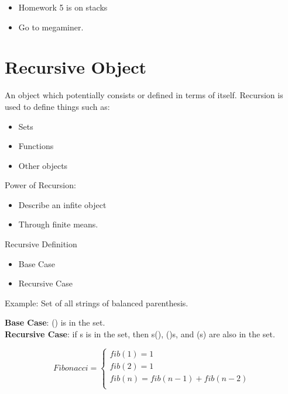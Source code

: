\documentclass[12pt]{article}
\begin{document}
\begin{itemize}
\item Homework 5 is on stacks
\item Go to megaminer.
\end{itemize}

\section{Recursive Object}
An object which potentially consists or defined in terms of itself. Recursion is used to define things such as:

\begin{itemize}
\item Sets
\item Functions
\item Other objects
\end{itemize}

Power of Recursion:
\begin{itemize}
\item Describe an infite object
\item Through finite means.
\end{itemize}

Recursive Definition
\begin{itemize}
\item Base Case
\item Recursive Case
\end{itemize}

Example: Set of all strings of balanced parenthesis.


\textbf{Base Case}: () is in the set. \\
\textbf{Recursive Case}: if s is in the set, then s(), ()s, and (s) are also in the set.

\begin{equation}
  Fibonacci = \left\{
    \begin{array}{rl}
      fib(1) = 1 \\
      fib(2) = 1 \\
      fib(n) = fib(n -1) + fib(n - 2) \\
    \end{array} \right.
\end{equation}
\end{document}
